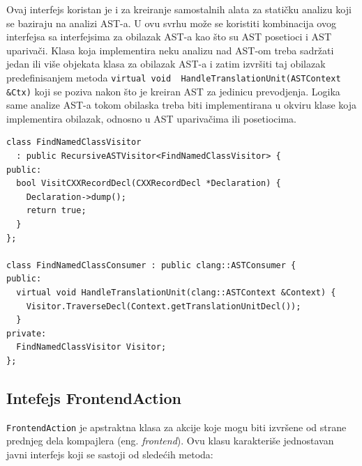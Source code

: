\documentclass[12pt,oneside]{memoir}
\begin{document}
Ovaj interfejs koristan je i za kreiranje samostalnih alata za stati\v{c}ku analizu koji se baziraju na analizi AST-a. U ovu svrhu mo\v{z}e se koristiti kombinacija
ovog interfejsa sa interfejsima za obilazak AST-a kao \v{s}to su AST posetioci i AST upariva\v{c}i. Klasa koja implementira neku analizu nad AST-om treba sadr\v{z}ati jedan ili vi\v{s}e objekata klasa za obilazak AST-a i zatim izvr\v{s}iti taj obilazak predefinisanjem metoda \lstinline{virtual void  HandleTranslationUnit(ASTContext &Ctx)} koji se poziva nakon \v{s}to je kreiran AST za jedinicu prevodjenja. Logika same analize AST-a tokom obilaska treba biti implementirana u okviru klase koja implementira obilazak, odnosno u AST upariva\v{c}ima ili posetiocima.

\begin{lstlisting}[caption={Primer upotrebe klase \textit{ASTConsumer} u svrhu stati\v{c}ke analize}, label=lst:label7, captionpos=b]
class FindNamedClassVisitor
  : public RecursiveASTVisitor<FindNamedClassVisitor> {
public:
  bool VisitCXXRecordDecl(CXXRecordDecl *Declaration) {
    Declaration->dump();
    return true;
  }
};

class FindNamedClassConsumer : public clang::ASTConsumer {
public:
  virtual void HandleTranslationUnit(clang::ASTContext &Context) {
    Visitor.TraverseDecl(Context.getTranslationUnitDecl());
  }
private:
  FindNamedClassVisitor Visitor;
};
\end{lstlisting}

\subsection{Intefejs FrontendAction}

\lstinline{FrontendAction} je apstraktna klasa za akcije koje mogu biti izvr\v{s}ene od strane prednjeg dela kompajlera (eng. \textit{frontend}).
Ovu klasu karakteri\v{s}e jednostavan javni interfejs koji se sastoji od slede\'{c}ih metoda:
\end{document}
